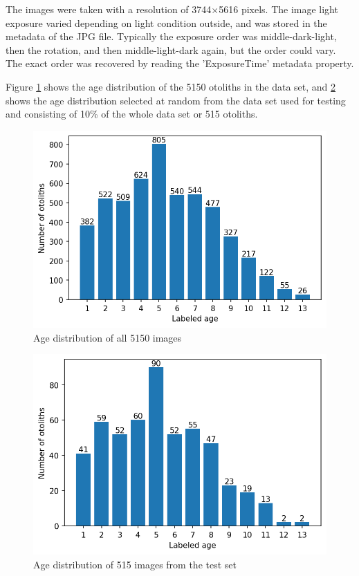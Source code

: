 \documentclass[10pt,letterpaper]{article}
\begin{document}
The images were taken with a resolution of 3744$\times$5616 pixels.  The image light exposure varied depending on light condition outside, and was stored in the metadata of the JPG file. Typically the exposure order was middle-dark-light, then the rotation, and then middle-light-dark again,
but the order could vary. The exact order was  recovered by reading the 'ExposureTime' metadata property.

Figure \ref{marker2} shows the age distribution of the 5150 otoliths in the data set, and \ref{marker3} shows the age distribution selected at random from the data set used for
testing and consisting of 10\% of the whole data set or 515 otoliths.

\begin{figure}[h!]
  \centering
  \includegraphics[scale=0.8]{distribution/age_distribution.png}
  \caption{Age distribution of all 5150 images}
    \label{marker2}
\end{figure}

\begin{figure}[h!]
  \centering
  \includegraphics[scale=0.80]{distribution/age_distribution_test.png}
  \caption{Age distribution of 515 images from the test set}
  \label{marker3}
\end{figure}
\end{document}
